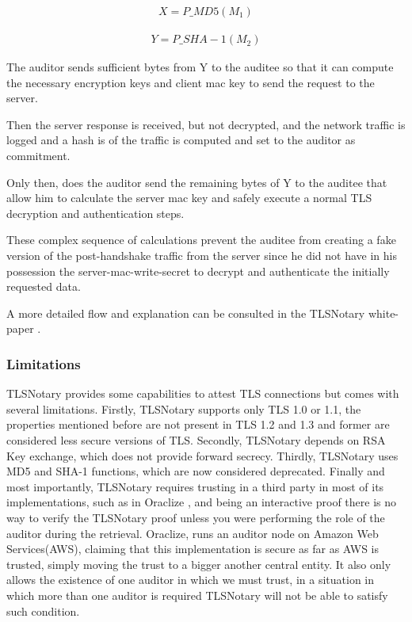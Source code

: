 \begin{ceqn}
    \begin{align}
        X = P\_MD5(M_{1})
    \end{align}
\end{ceqn}

\begin{ceqn}
    \begin{align}
        Y = P\_SHA-1(M_{2})
    \end{align}
\end{ceqn}

The auditor sends sufficient bytes from Y to the auditee so that it can compute the necessary encryption keys and client mac key to send the request to the server. 

Then the server response is received, but not decrypted, and the network traffic is logged and a hash is of the traffic is computed and set to the auditor as commitment. 

Only then, does the auditor send the remaining bytes of Y to the auditee that allow him to calculate the server mac key and safely execute a normal TLS decryption and authentication steps.

These complex sequence of calculations prevent the auditee from creating a fake version of the post-handshake traffic from the server since he did not have in his possession the server-mac-write-secret to decrypt and authenticate the initially requested data.

A more detailed flow and explanation can be consulted in the TLSNotary white-paper \cite{2014TLSnotary-aSessions}.

   
\subsubsection{Limitations}
TLSNotary provides some capabilities to attest TLS connections but comes with several limitations. Firstly, TLSNotary supports only TLS 1.0 or 1.1, the properties mentioned before are not present in TLS 1.2 and 1.3 and former are considered less secure versions of TLS. Secondly, TLSNotary depends on RSA Key exchange, which does not provide forward secrecy. Thirdly, TLSNotary uses MD5 and SHA-1 functions, which are now considered deprecated. Finally and most importantly, TLSNotary requires trusting in a third party in most of its implementations, such as in Oraclize \cite{Oraclize.it2018OraclizeDocumentation}, and being an interactive proof there is no way to verify the TLSNotary proof unless you were performing the role of the auditor during the retrieval. Oraclize, runs an auditor node on Amazon Web Services(AWS), claiming that this implementation is secure as far as AWS is trusted, simply moving the trust to a bigger another central entity. It also only allows the existence of one auditor in which we must trust, in a situation in which more than one auditor is required TLSNotary will not be able to satisfy such condition.


